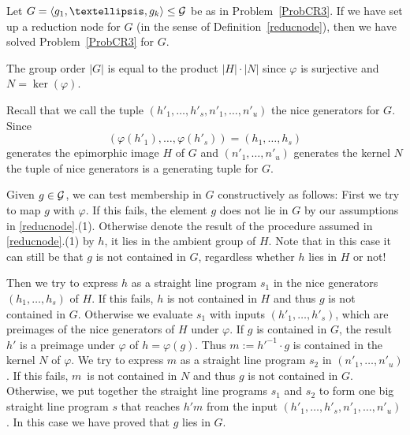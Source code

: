 \begin{Prop}
Let $G = \left< g_1, \ldots, g_k \right> \le \GG$ be as in 
Problem~\ref{ProbCR3}.
If we have set up a reduction node for $G$ (in the sense of
Definition~\ref{reducnode}), then we have solved
Problem~\ref{ProbCR3} for $G$.
\end{Prop}
\proofbeg
The group order $|G|$ is equal to the product $|H| \cdot |N|$ since
$\varphi$ is surjective and $N = \ker(\varphi)$.

Recall that we call the tuple $(h'_1, \ldots, h'_s, n'_1, \ldots, n'_u)$
the nice generators for $G$. Since 
%
\[ (\varphi(h'_1), \ldots, \varphi(h'_s))
= (h_1, \ldots, h_s) \] 
generates the epimorphic image $H$ of $G$ and
$(n'_1, \ldots, n'_u)$ generates the kernel $N$ the tuple of nice
generators is a generating tuple for $G$.

Given $g \in \mathcal{G}$, we can test membership in $G$ constructively as follows:
First we try to map $g$ with $\varphi$. If this fails, the element $g$
does not lie in $G$ by our assumptions in \ref{reducnode}.(1). Otherwise
denote the result of the procedure assumed in \ref{reducnode}.(1) by $h$, 
it lies in the ambient group of $H$. 
Note that in this case it can still be that
$g$ is not contained in $G$, regardless whether $h$ lies in $H$ or not! 

Then we try to express $h$ as a straight 
line program $s_1$ in the nice generators $(h_1, \ldots, h_s)$ of $H$. If this
%
fails, $h$ is not contained in $H$ and thus $g$ is not contained in
$G$. Otherwise we evaluate $s_1$ with inputs
$(h'_1, \ldots, h'_s)$, which are preimages of the nice generators of $H$ under
$\varphi$. If $g$ is contained in $G$, the result $h'$ is a preimage 
under $\varphi$ of $h = \varphi(g)$. Thus $m := h'^{-1}\cdot g$ is contained
in the kernel $N$ of $\varphi$. We try to express $m$ as a straight
line program $s_2$ in $(n'_1, \ldots, n'_u)$. If this fails, 
%
$m$~is not contained in $N$ and thus $g$ is not contained in $G$. Otherwise,
we put together the straight line programs $s_1$ and $s_2$ to form
one big straight line program $s$ that reaches $h'm$ from the input 
%
$(h'_1, \ldots, h'_s, n'_1, \ldots, n'_u)$. In this case we have proved
that $g$ lies in $G$.
\proofend

